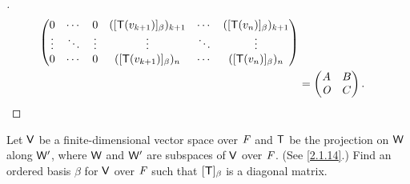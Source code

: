 \begin{proof}[]
\begin{align*}
\begin{pmatrix}
                       0       & \cdots & 0       & ([\mathsf{T}(v_{k + 1})]_{\beta})_{k + 1} & \cdots & ([\mathsf{T}(v_n)]_{\beta})_{k + 1} \\
                       \vdots  & \ddots & \vdots  & \vdots                            & \ddots & \vdots                      \\
                       0       & \cdots & 0       & ([\mathsf{T}(v_{k + 1})]_{\beta})_{n}     & \cdots & ([\mathsf{T}(v_n)]_{\beta})_{n}
                     \end{pmatrix} \\
                 & = \begin{pmatrix}
                       A   & B \\
                       \mathit{O} & C
                     \end{pmatrix}.
  \end{align*}
\end{proof}

\begin{ex}\label{ex:2.2.12}
  Let \(\mathsf{V}\) be a finite-dimensional vector space over \(\mathit{F}\) and \(\mathsf{T}\) be the projection on \(\mathsf{W}\) along \(\mathsf{W}'\), where \(\mathsf{W}\) and \(\mathsf{W}'\) are subspaces of \(\mathsf{V}\) over \(\mathit{F}\).
  (See \cref{2.1.14}.)
  Find an ordered basis \(\beta\) for \(\mathsf{V}\) over \(\mathit{F}\) such that \([\mathsf{T}]_{\beta}\) is a diagonal matrix.
\end{ex}

